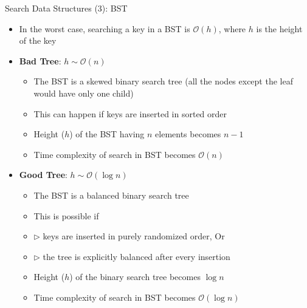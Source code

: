 \documentclass[aspectratio=169, xcolor=dvipsnames]{beamer}
\begin{document}
\begin{frame}{Search Data Structures (3): BST}
    \begin{itemize}[<+->]
        \item In the worst case, searching a key in a BST is $\mathcal{O}(h)$, where $h$ is the height of the key
        \item \textbf{Bad Tree}: $h \sim \mathcal{O}(n)$
        \begin{itemize}[<+->]
            \item The BST is a skewed binary search tree (all the nodes except the leaf would have only one child)
            \item This can happen if keys are inserted in sorted order
            \item Height ($h$) of the BST having $n$ elements becomes $n - 1$
            \item Time complexity of search in BST becomes $\mathcal{O}(n)$
        \end{itemize}
        \item \textbf{Good Tree}: $h \sim \mathcal{O}(\log n)$
        \begin{itemize}[<+->]
            \item The BST is a balanced binary search tree
            \item This is possible if
            \item $\triangleright$ keys are inserted in purely randomized order, Or
            \item $\triangleright$ the tree is explicitly balanced after every insertion
            \item Height ($h$) of the binary search tree becomes $\log n$
            \item Time complexity of search in BST becomes $\mathcal{O}(\log n)$
        \end{itemize}
    \end{itemize}
\end{frame}
\end{document}
